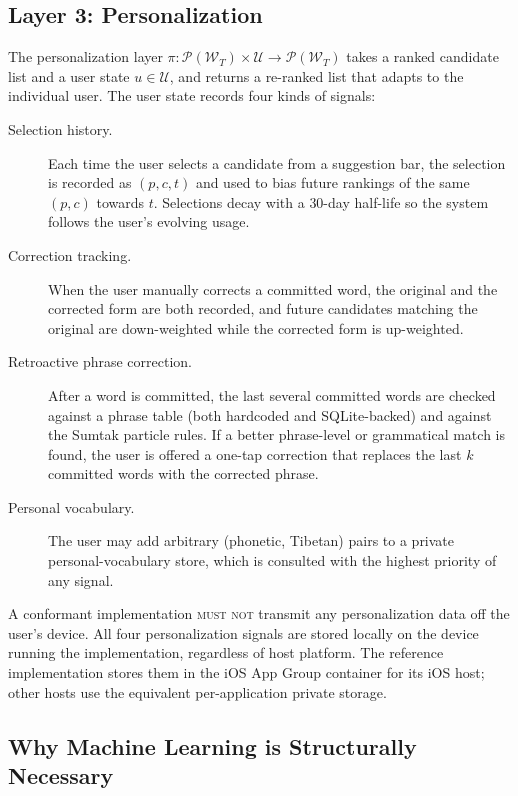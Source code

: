 \documentclass[11pt]{article}
\begin{document}
\subsection{Layer 3: Personalization}
\label{sec:layer-personalization}

The personalization layer $\pi: \mathcal{P}(\mathcal{W}_T) \times \mathcal{U} \to \mathcal{P}(\mathcal{W}_T)$ takes a ranked candidate list and a user state $u \in \mathcal{U}$, and returns a re-ranked list that adapts to the individual user. The user state records four kinds of signals:

\begin{description}
\item[Selection history.] Each time the user selects a candidate from a suggestion bar, the selection is recorded as $(p, c, t)$ and used to bias future rankings of the same $(p, c)$ towards $t$. Selections decay with a 30-day half-life so the system follows the user's evolving usage.
\item[Correction tracking.] When the user manually corrects a committed word, the original and the corrected form are both recorded, and future candidates matching the original are down-weighted while the corrected form is up-weighted.
\item[Retroactive phrase correction.] After a word is committed, the last several committed words are checked against a phrase table (both hardcoded and SQLite-backed) and against the Sumtak particle rules. If a better phrase-level or grammatical match is found, the user is offered a one-tap correction that replaces the last $k$ committed words with the corrected phrase.
\item[Personal vocabulary.] The user may add arbitrary (phonetic, Tibetan) pairs to a private personal-vocabulary store, which is consulted with the highest priority of any signal.
\end{description}

A conformant implementation \textsc{must not} transmit any personalization data off the user's device. All four personalization signals are stored locally on the device running the implementation, regardless of host platform. The reference implementation stores them in the iOS App Group container for its iOS host; other hosts use the equivalent per-application private storage.

\subsection{Why Machine Learning is Structurally Necessary}
\label{sec:ml-necessary}
\end{document}
